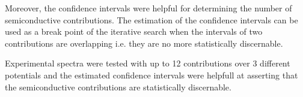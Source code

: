 \documentclass[10pt, 3p, sort&compress]{elsarticle}
\begin{document}
Moreover, the confidence intervals were helpful for determining the number of semiconductive contributions. The estimation of the confidence intervals can be used as a break point of the iterative search when the intervals of two contributions are overlapping i.e. they are no more statistically discernable. 

Experimental spectra were tested with up to 12 contributions over 3 different potentials and the estimated confidence intervals were helpfull at asserting that the semiconductive contributions are statistically discernable.



\end{document}
